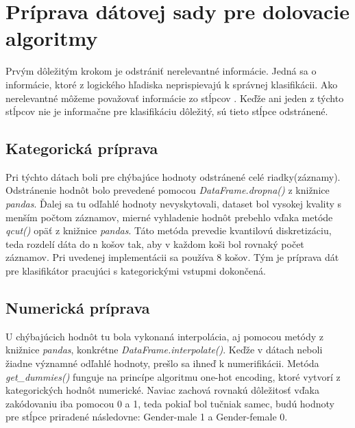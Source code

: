 \documentclass[a4paper, 16pt]{article}
\begin{document}
\section{Príprava dátovej sady pre dolovacie algoritmy}
Prvým dôležitým krokom je odstrániť nerelevantné informácie. Jedná sa o informácie, ktoré z logického hľadiska neprispievajú k správnej klasifikácii. Ako nerelevantné môžeme považovať informácie zo stĺpcov . Keďže ani jeden z týchto stĺpcov nie je informačne pre klasifikáciu dôležitý, sú tieto stĺpce odstránené.



\subsection{Kategorická príprava}
Pri týchto dátach boli pre chýbajúce hodnoty odstránené celé riadky(záznamy). Odstránenie hodnôt bolo prevedené pomocou \emph{DataFrame.dropna()} z knižnice \emph{pandas}. Ďalej sa tu odľahlé hodnoty nevyskytovali, dataset bol vysokej kvality s menším počtom záznamov, mierné vyhladenie hodnôt prebehlo vďaka metóde \emph{qcut()} opäť z knižnice \emph{pandas}. Táto metóda prevedie kvantilovú diskretizáciu, teda rozdelí dáta do n košov tak, aby v každom koši bol rovnaký počet záznamov. Pri uvedenej implementácii sa používa 8 košov. Tým je príprava dát pre klasifikátor pracujúci s kategorickými vstupmi dokončená.



\subsection{Numerická príprava}
U chýbajúcich hodnôt tu bola vykonaná interpolácia, aj pomocou metódy z knižnice \emph{pandas}, konkrétne \emph{DataFrame.interpolate()}. Keďže v dátach neboli žiadne významné odľahlé hodnoty, prešlo sa ihneď k numerifikácii. Metóda \emph{get\_dummies()} funguje na princípe algoritmu one-hot encoding, ktoré vytvorí z kategorických hodnôt numerické. Naviac zachová rovnakú dôležitosť vďaka zakódovaniu iba pomocou 0 a 1, teda pokiaľ bol tučniak samec, budú hodnoty pre stĺpce priradené následovne: Gender-male 1 a Gender-female 0.
\end{document}
